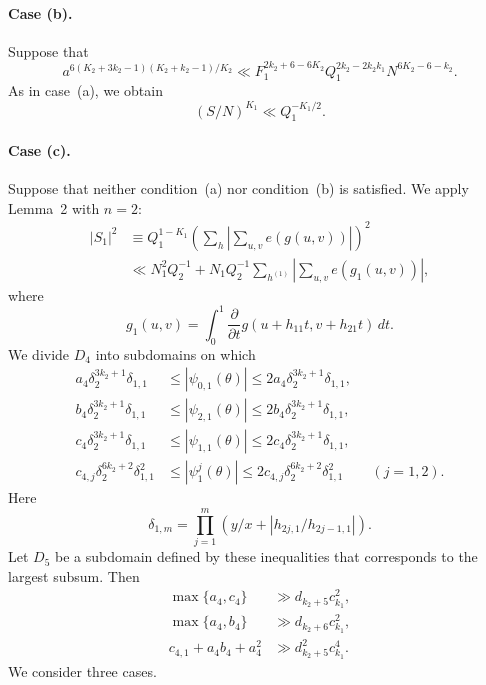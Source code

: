 \documentclass[10pt]{article}
\begin{document}
\paragraph{Case (b).}
Suppose that
\begin{equation}
  a^{6(K_2+3k_2-1)(K_2+k_2-1)/K_2}
  \ll F_1^{2k_2+6-6K_2}Q_1^{2k_2-2k_2k_1}N^{6K_2-6-k_2}.
  \tag{b}
\end{equation}
As in case~(a), we obtain
\[
  (S/N)^{K_1}\ll Q_1^{-K_1/2}.
\]

\paragraph{Case (c).}
Suppose that neither condition~(a) nor condition~(b) is satisfied. We apply Lemma~2 with $n=2$:
\[
\begin{aligned}
  |S_1|^2
  &\equiv Q_1^{1-K_1}
    \left(\sum_h\left|\sum_{u,v}e(g(u,v))\right|\right)^2\\
  &\ll N_1^2Q_2^{-1}
    +N_1Q_2^{-1}\sum_{h^{(1)}}
      \left|\sum_{u,v}e(g_1(u,v))\right|,
\end{aligned}
\]
where
\[
  g_1(u,v)=\int_0^1\frac{\partial}{\partial t}
    g(u+h_{11}t,v+h_{21}t)\,dt.
\]
We divide $D_4$ into subdomains on which
\[
\begin{aligned}
  a_4\delta_2^{3k_2+1}\delta_{1,1}
  &\leqslant|\psi_{0,1}(\theta)|
   \leqslant2a_4\delta_2^{3k_2+1}\delta_{1,1},\\
  b_4\delta_2^{3k_2+1}\delta_{1,1}
  &\leqslant|\psi_{2,1}(\theta)|
   \leqslant2b_4\delta_2^{3k_2+1}\delta_{1,1},\\
  c_4\delta_2^{3k_2+1}\delta_{1,1}
  &\leqslant|\psi_{1,1}(\theta)|
   \leqslant2c_4\delta_2^{3k_2+1}\delta_{1,1},\\
  c_{4,j}\delta_2^{6k_2+2}\delta_{1,1}^2
  &\leqslant|\psi_1^j(\theta)|
   \leqslant2c_{4,j}\delta_2^{6k_2+2}\delta_{1,1}^2
  \qquad(j=1,2).
\end{aligned}
\]
Here
\[
  \delta_{1,m}=\prod_{j=1}^m
  \left(y/x+\left|h_{2j,1}/h_{2j-1,1}\right|\right).
\]
Let $D_5$ be a subdomain defined by these inequalities that corresponds to the largest subsum. Then
\begin{equation}
\begin{aligned}
  \max\{a_4,c_4\}&\gg d_{k_2+5}c_{k_1}^2,\\
  \max\{a_4,b_4\}&\gg d_{k_2+6}c_{k_1}^2,\\
  c_{4,1}+a_4b_4+a_4^2&\gg d_{k_2+5}^2c_{k_1}^4.
\end{aligned}
\tag{9}
\end{equation}
We consider three cases.
\end{document}
